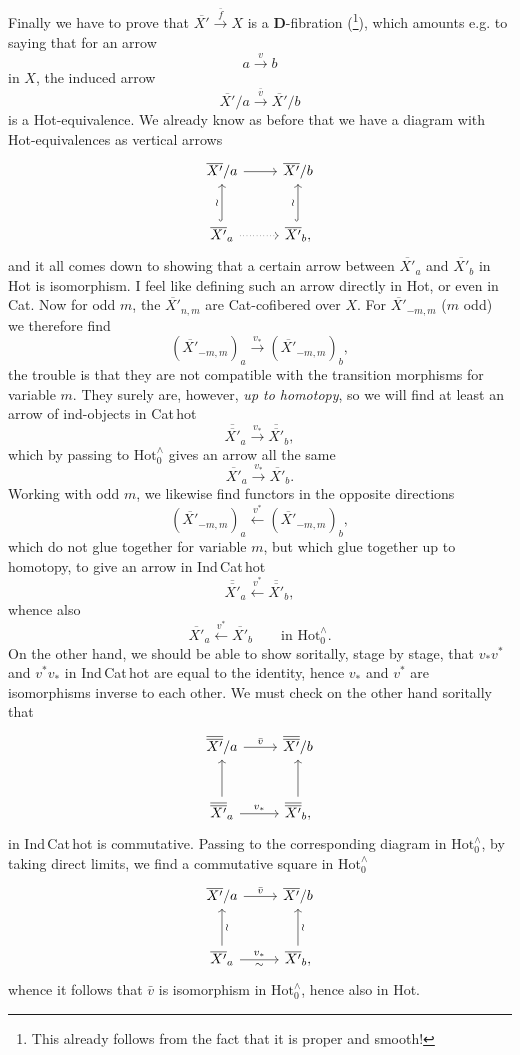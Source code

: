 \documentclass[11pt]{article}
\newcommand{\printedpage}[1]{\marginpar{\footnotesize p.~#1}}
\newcommand{\msp}[1]{\marginpar{\footnotesize [#1]}}
\newcommand{\Xb}{\overline{X'}}
\newcommand{\Xbb}{\overline{\overline{X'}}}
\newcommand{\Hotz}{\mathrm{Hot}^{\wedge}_{0}}
\begin{document}
\msp{page 154}
Finally we have to prove that $\Xb \xrightarrow{\bar f} X$ is a \textbf{D}-fibration (\footnote[39]{This already follows from the fact that it is proper and smooth!}), which amounts e.g. to saying that for an arrow
\[
a \xrightarrow{v} b
\]
in $X$, the induced arrow
\[
\Xb/a \xrightarrow{\bar v} \Xb/b
\]
is a Hot-equivalence. We already know as before that we have a diagram with Hot-equivalences as vertical arrows
\[
\begin{tikzcd}[row sep=large]
\Xb/a \arrow[r] & \Xb/b \\
\Xb_a \arrow[u, hook, "\wr"] \arrow[r, dotted] & \Xb_b, \arrow[u, hook, "\wr"]
\end{tikzcd}
\]
and it all comes down to showing that a certain arrow between $\Xb_a$ and $\Xb_b$ in Hot is isomorphism. I feel like defining such an arrow directly in Hot, or even in Cat. Now for odd $m$, the $\Xb_{n,m}$ are Cat-cofibered over $X$. For $\Xb_{-m,m}$ ($m$ odd) we therefore find
\[
(\Xb_{-m,m})_a \xrightarrow{v_*} (\Xb_{-m,m})_b,
\]
\msp{page 155}
the trouble is that they are not compatible with the transition morphisms for variable $m$. They surely are, however, \textit{up to homotopy}, so we will find at least an arrow of ind-objects in Cat\,hot
\[
\Xbb_a \xrightarrow{v_*} \Xbb_b,
\]
which by passing to $\Hotz$ gives an arrow all the same
\[
\Xb_a \xrightarrow{v_*} \Xb_b.
\]
Working with odd $m$, we likewise find functors in the opposite directions %
\[
(\Xb_{-m,m})_a \xleftarrow{v^*} (\Xb_{-m,m})_b,
\]
\printedpage{97}
which do not glue together for variable $m$, but which glue together up to homotopy, to give an arrow in Ind\,Cat\,hot
\[
\Xbb_a \xleftarrow{v^*} \Xbb_b,
\]
whence also
\[
\Xb_a \xleftarrow{v^*} \Xb_b \qquad \text{in } \Hotz.
\]
On the other hand, we should be able to show soritally,
\msp{page 156}
stage by stage, that $v_*v^*$ and $v^*v_*$ in Ind\,Cat\,hot are equal to the identity, hence $v_*$ and $v^*$ are isomorphisms inverse to each other. We must check on the other hand soritally that
\[
\begin{tikzcd}[row sep=large]
\Xbb/a \arrow[r, "\bar v"] & \Xbb/b \\
\Xbb_a \arrow[u] \arrow[r, "v_*"] & \Xbb_b, \arrow[u]
\end{tikzcd}
\]
in Ind\,Cat\,hot is commutative. Passing to the corresponding diagram in $\Hotz$, by taking direct limits, we find a commutative square in $\Hotz$
\[
\begin{tikzcd}[row sep=large]
\Xb/a \arrow[r, "\bar v"] & \Xb/b \\
\Xb_a \arrow[u, "\wr"'] \arrow[r, "v_*", "\sim"'] & \Xb_b, \arrow[u, "\wr"']
\end{tikzcd}
\]
whence it follows that $\bar v$ is isomorphism in $\Hotz$, hence also in Hot.
\end{document}
